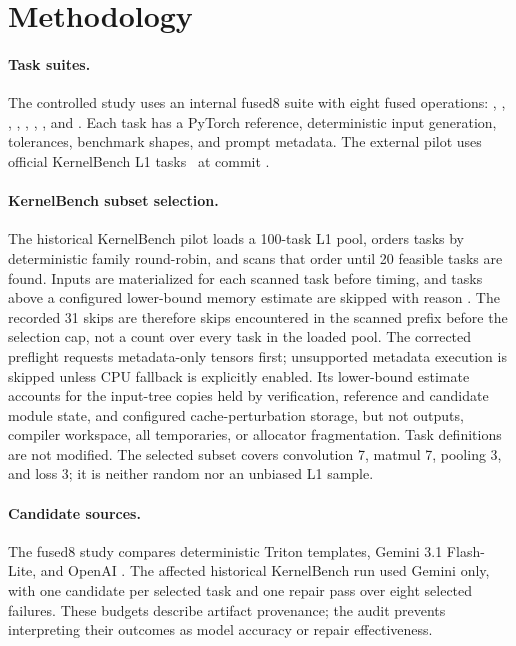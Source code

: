\section{Methodology}

\paragraph{Task suites.}
The controlled study uses an internal fused8 suite with eight fused operations: , , , , , , , and . Each task has a PyTorch reference, deterministic input generation, tolerances, benchmark shapes, and prompt metadata. The external pilot uses official KernelBench L1 tasks~\cite{kernelbench2025} at commit .

\paragraph{KernelBench subset selection.}
The historical KernelBench pilot loads a 100-task L1 pool, orders tasks by deterministic family round-robin, and scans that order until 20 feasible tasks are found. Inputs are materialized for each scanned task before timing, and tasks above a configured lower-bound memory estimate are skipped with reason . The recorded 31 skips are therefore skips encountered in the scanned prefix before the selection cap, not a count over every task in the loaded pool. The corrected preflight requests metadata-only tensors first; unsupported metadata execution is skipped unless CPU fallback is explicitly enabled. Its lower-bound estimate accounts for the input-tree copies held by verification, reference and candidate module state, and configured cache-perturbation storage, but not outputs, compiler workspace, all temporaries, or allocator fragmentation. Task definitions are not modified. The selected subset covers convolution 7, matmul 7, pooling 3, and loss 3; it is neither random nor an unbiased L1 sample.

\paragraph{Candidate sources.}
The fused8 study compares deterministic Triton templates, Gemini 3.1 Flash-Lite, and OpenAI . The affected historical KernelBench run used Gemini only, with one candidate per selected task and one repair pass over eight selected failures. These budgets describe artifact provenance; the audit prevents interpreting their outcomes as model accuracy or repair effectiveness.

